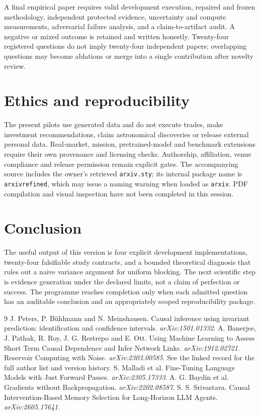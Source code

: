 \documentclass[10pt]{article}
\begin{document}
A final empirical paper requires valid development execution, repaired and frozen methodology, independent protected evidence, uncertainty and compute measurements, adversarial failure analysis, and a claim-to-artifact audit. A negative or mixed outcome is retained and written honestly. Twenty-four registered questions do not imply twenty-four independent papers; overlapping questions may become ablations or merge into a single contribution after novelty review.

\section{Ethics and reproducibility}
The present pilots use generated data and do not execute trades, make investment recommendations, claim astronomical discoveries or release external personal data. Real-market, mission, pretrained-model and benchmark extensions require their own provenance and licensing checks. Authorship, affiliation, venue compliance and release permission remain explicit gates. The accompanying source includes the owner's retrieved \texttt{arxiv.sty}; its internal package name is \texttt{arxivrefined}, which may issue a naming warning when loaded as \texttt{arxiv}. PDF compilation and visual inspection have not been completed in this session.

\section{Conclusion}
The useful output of this version is four explicit development implementations, twenty-four falsifiable study contracts, and a bounded theoretical diagnosis that rules out a naive variance argument for uniform blocking. The next scientific step is evidence generation under the declared limits, not a claim of perfection or success. The programme reaches completion only when each admitted question has an auditable conclusion and an appropriately scoped reproducibility package.

\begin{thebibliography}{9}
 J. Peters, P. B\"uhlmann and N. Meinshausen. Causal inference using invariant prediction: identification and confidence intervals. \emph{arXiv:1501.01332}.
 A. Banerjee, J. Pathak, R. Roy, J. G. Restrepo and E. Ott. Using Machine Learning to Assess Short Term Causal Dependence and Infer Network Links. \emph{arXiv:1912.02721}.
 Reservoir Computing with Noise. \emph{arXiv:2303.00585}. See the linked record for the full author list and version history.
 S. Malladi et al. Fine-Tuning Language Models with Just Forward Passes. \emph{arXiv:2305.17333}.
 A. G. Baydin et al. Gradients without Backpropagation. \emph{arXiv:2202.08587}.
 S. S. Srivastava. Causal Intervention-Based Memory Selection for Long-Horizon LLM Agents. \emph{arXiv:2605.17641}.
\end{thebibliography}
\end{document}
